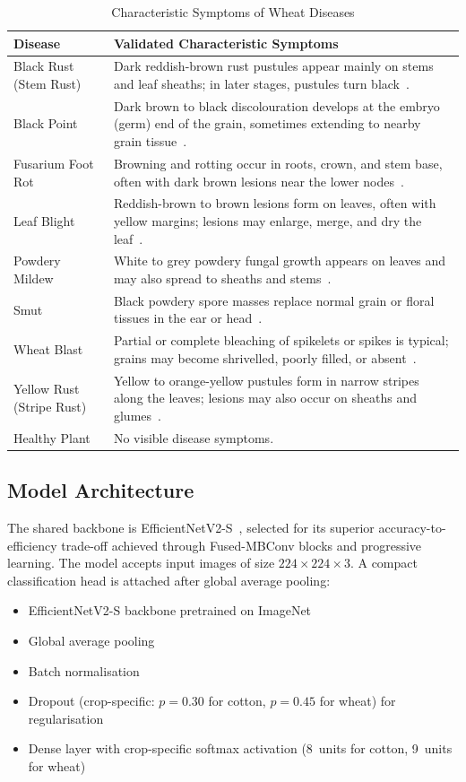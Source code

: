 \documentclass[12pt,a4paper]{report}
\begin{document}
\begin{table}[H]
\centering
\caption{Characteristic Symptoms of Wheat Diseases}
\label{tab:wheat-symptoms}
\begin{tabular}{lp{9.5cm}}
\toprule
Disease & Validated Characteristic Symptoms \\
\midrule
Black Rust (Stem Rust) & Dark reddish-brown rust pustules appear mainly on stems and leaf sheaths; in later stages, pustules turn black~\cite{b33}. \\
Black Point & Dark brown to black discolouration develops at the embryo (germ) end of the grain, sometimes extending to nearby grain tissue~\cite{b34}. \\
Fusarium Foot Rot & Browning and rotting occur in roots, crown, and stem base, often with dark brown lesions near the lower nodes~\cite{b35}. \\
Leaf Blight & Reddish-brown to brown lesions form on leaves, often with yellow margins; lesions may enlarge, merge, and dry the leaf~\cite{b36}. \\
Powdery Mildew & White to grey powdery fungal growth appears on leaves and may also spread to sheaths and stems~\cite{b37}. \\
Smut & Black powdery spore masses replace normal grain or floral tissues in the ear or head~\cite{b38}. \\
Wheat Blast & Partial or complete bleaching of spikelets or spikes is typical; grains may become shrivelled, poorly filled, or absent~\cite{b39}. \\
Yellow Rust (Stripe Rust) & Yellow to orange-yellow pustules form in narrow stripes along the leaves; lesions may also occur on sheaths and glumes~\cite{b40}. \\
Healthy Plant & No visible disease symptoms. \\
\bottomrule
\end{tabular}
\end{table}

\subsection{Model Architecture}
The shared backbone is EfficientNetV2-S~\cite{b1}, selected for its superior accuracy-to-efficiency trade-off achieved through Fused-MBConv blocks and progressive learning. The model accepts input images of size $224 \times 224 \times 3$. A compact classification head is attached after global average pooling:

\begin{itemize}
    \item EfficientNetV2-S backbone pretrained on ImageNet~\cite{b15}
    \item Global average pooling
    \item Batch normalisation
    \item Dropout (crop-specific: $p = 0.30$ for cotton, $p = 0.45$ for wheat) for regularisation
    \item Dense layer with crop-specific softmax activation (8~units for cotton, 9~units for wheat)
\end{itemize}
\end{document}
